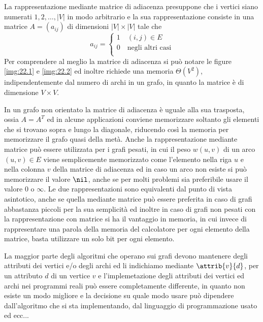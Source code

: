 La rappresentazione mediante matrice di adiacenza presuppone che i vertici siano numerati $1, 2, \dots, |V|$ in modo arbitrario e la sua rappresentazione consiste 
in una matrice $A = (a_{ij})$ di dimensioni $|V| \times |V|$ tale che 
\[ 
    a_{ij} = \begin{cases}
                1 \quad (i, j) \in E \\
                0 \quad \text{negli altri casi} \\
             \end{cases} \]
Per comprendere al meglio la matrice di adiacenza si può notare le figure \ref{img:22.1} e \ref{img:22.2} ed inoltre richiede una memoria $\Theta(V^2)$,
indipendentemente dal numero di archi in un grafo, in quanto la matrice è di dimensione $V \times V$.

In un grafo non orientato la matrice di adiacenza è uguale alla sua trasposta, ossia $A = A^T$ ed in alcune applicazioni conviene memorizzare soltanto gli elementi
che si trovano sopra e lungo la diagonale, riducendo così la memoria per memorizzare il grafo quasi della metà.\newline
Anche la rappresentazione mediante matrice può essere utilizzata per i grafi pesati, in cui il peso $w(u, v)$ di un arco $(u, v) \in E$ viene semplicemente memorizzato
come l'elemento nella riga $u$ e nella colonna $v$ della matrice di adiacenza ed in caso un arco non esiste si può memorizzare il valore $\nil$, anche se per 
molti problemi sia preferibile usare il valore $0$ o $\infty$.\newline
Le due rappresentazioni sono equivalenti dal punto di vista asintotico, anche se quella mediante matrice può essere preferita in caso di grafi abbastanza piccoli
per la sua semplicità ed inoltre in caso di grafi non pesati con la rappresentazione con matrice si ha il vantaggio in memoria, in cui invece di rappresentare una 
parola della memoria del calcolatore per ogni elemento della matrice, basta utilizzare un solo bit per ogni elemento.

La maggior parte degli algoritmi che operano sui grafi devono mantenere degli attributi dei vertici e/o degli archi ed li indichiamo mediante $\attrib{v}{d}$,
per un attributo $d$ di un vertice $v$ e l'implemetazione degli attributi dei vertici ed archi nei programmi reali può essere completamente differente, in quanto
non esiste un modo migliore e la decisione su quale modo usare può dipendere dall'algoritmo che si sta implementando, dal linguaggio di programmazione usato ed ecc...

